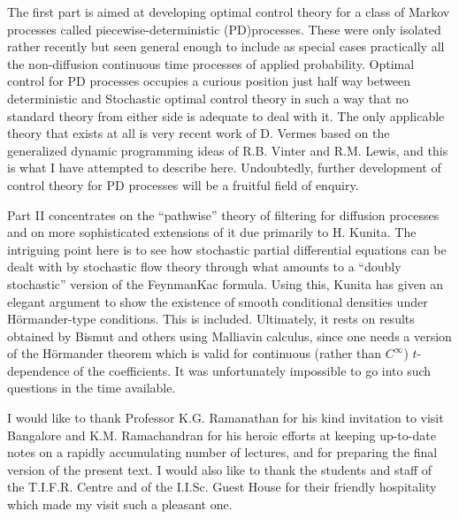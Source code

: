 The first part is aimed at developing optimal control theory for a
class of Markov processes called piecewise-deterministic (PD)proce\-sses. These were only isolated rather recently but seen
general enough to include as special cases practically all the
non-diffusion continuous time processes of applied
probability. Optimal control for PD processes occupies a curious
position just half way between deterministic and Sto\-chastic optimal
control theory in such a way that no standard theory from either side
is adequate to deal with it. The only applicable theory that exists at
all is very recent work of D. Vermes based on the generalized dynamic
programming ideas of R.B. Vinter and R.M. Lewis, and this is what I
have attempted to describe here. Undoubtedly, further development of
control theory for PD processes will be a fruitful field of enquiry. 

Part II concentrates on the ``pathwise'' theory of filtering for
diffusion processes and on more sophisticated extensions of it due
primarily to H. Kunita. The intriguing point here is to see how
stochastic partial differential equations can be dealt with by
stochastic flow theory through what amounts to a ``doubly stochastic''
version of the FeynmanKac formula. Using this, Kunita has given an
elegant argument to show the existence of smooth conditional densities
under H\"ormander-type conditions. This is included. Ultimately, it
rests on results obtained by Bismut and others using Malliavin
calculus, since one needs a version of the H\"ormander theorem which
is valid for continuous (rather than $C^{\infty}$) $t$-dependence of
the coefficients. It was unfortunately impossible to go into such
questions in the time available.

I would like to thank Professor K.G. Ramanathan for his kind
invitation to visit Bangalore and K.M. Ramachandran for his heroic
efforts at keeping up-to-date notes on a rapidly accumulating number
of lectures, and for preparing the final version of the present
text. I would also like to thank the students and staff of the
T.I.F.R. Centre and of the I.I.Sc. Guest House for their friendly
hospitality which made my visit such a pleasant one. 
